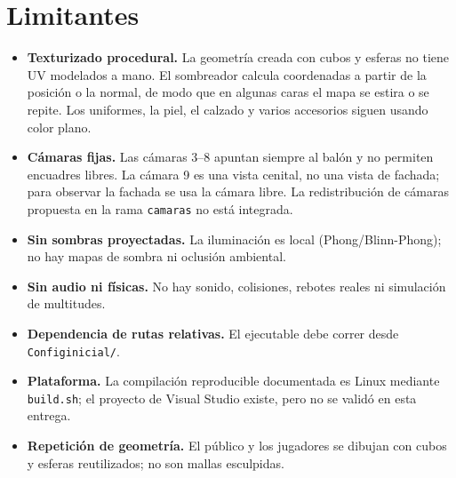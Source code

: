 \documentclass[12pt,letterpaper]{article}
\begin{document}
\section{Limitantes}
\begin{itemize}
  \item \textbf{Texturizado procedural.} La geometría creada con cubos y esferas no tiene UV
        modelados a mano. El sombreador calcula coordenadas a partir de la posición o la normal, de
        modo que en algunas caras el mapa se estira o se repite. Los uniformes, la piel, el calzado y
        varios accesorios siguen usando color plano.
  \item \textbf{Cámaras fijas.} Las cámaras 3--8 apuntan siempre al balón y no permiten encuadres
        libres. La cámara 9 es una vista cenital, no una vista de fachada; para observar la fachada
        se usa la cámara libre. La redistribución de cámaras propuesta en la rama \texttt{camaras}
        no está integrada.
  \item \textbf{Sin sombras proyectadas.} La iluminación es local (Phong/Blinn-Phong); no hay mapas
        de sombra ni oclusión ambiental.
  \item \textbf{Sin audio ni físicas.} No hay sonido, colisiones, rebotes reales ni simulación de
        multitudes.
  \item \textbf{Dependencia de rutas relativas.} El ejecutable debe correr desde \texttt{Configinicial/}.
  \item \textbf{Plataforma.} La compilación reproducible documentada es Linux mediante
        \texttt{build.sh}; el proyecto de Visual Studio existe, pero no se validó en esta entrega.
  \item \textbf{Repetición de geometría.} El público y los jugadores se dibujan con cubos y esferas
        reutilizados; no son mallas esculpidas.
\end{itemize}
\end{document}
